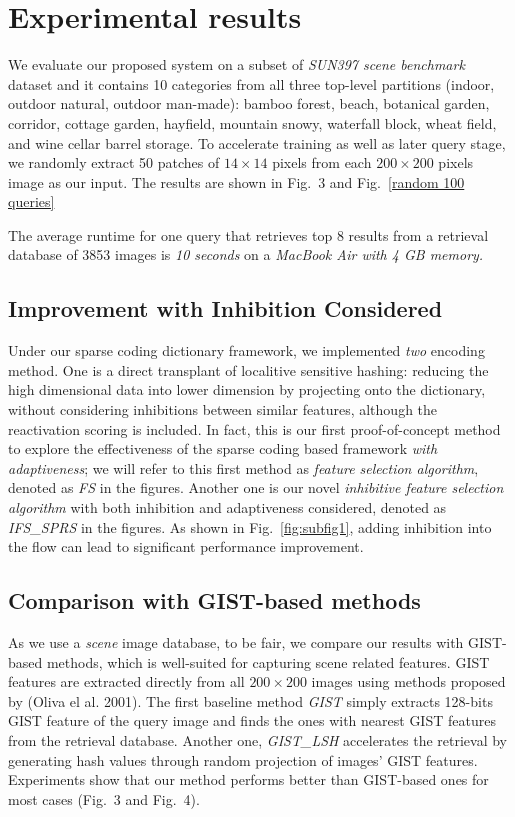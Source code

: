 \documentclass[letterpaper]{article}
\begin{document}
\section{Experimental results}
We evaluate our proposed system on a subset of \emph{SUN397 scene benchmark} dataset and it contains 10 categories from all three top-level partitions (indoor, outdoor natural, outdoor man-made): bamboo forest, beach, botanical garden, corridor, cottage garden, hayfield, mountain snowy, waterfall block, wheat field, and wine cellar barrel storage. To accelerate training as well as later query stage, we randomly extract 50 patches of $14\times14$ pixels from each $200\times200$ pixels image as our input. The results are shown in Fig.~3 and Fig.~\ref{random 100 queries}

The average runtime for one query that retrieves top 8 results from a retrieval database of 3853 images is \emph{10 seconds} on a \emph{MacBook Air with 4 GB memory.}

\subsection{Improvement with Inhibition Considered}
Under our sparse coding dictionary framework, we implemented \emph{two} encoding method. One is a direct transplant of localitive sensitive hashing: reducing the high dimensional data into lower dimension by projecting onto the dictionary, without considering inhibitions between similar features, although the reactivation scoring is included. In fact, this is our first proof-of-concept method to explore the effectiveness of the sparse coding based framework \emph{with adaptiveness}; we will refer to this first method as \emph{feature selection algorithm}, denoted as \emph{FS} in the figures. Another one is our novel \emph{inhibitive feature selection algorithm} with both inhibition and adaptiveness considered, denoted as \emph{IFS\_SPRS} in the figures. As shown in Fig.~\ref{fig:subfig1}, adding inhibition into the flow can lead to significant performance improvement.

\subsection{Comparison with GIST-based methods}
As we use a \emph{scene} image database, to be fair, we compare our results with GIST-based methods, which is well-suited for capturing scene related features. GIST features are extracted directly from all $200\times 200$ images using methods proposed by (Oliva el al. 2001).
The first baseline method \emph{GIST} simply extracts 128-bits GIST feature of the query image and finds the ones with nearest GIST features from the retrieval database. Another one, \emph{GIST\_LSH} accelerates the retrieval by generating hash values through random projection of images' GIST features. Experiments show that our method performs better than GIST-based ones for most cases (Fig.~3 and Fig.~4).
\end{document}
